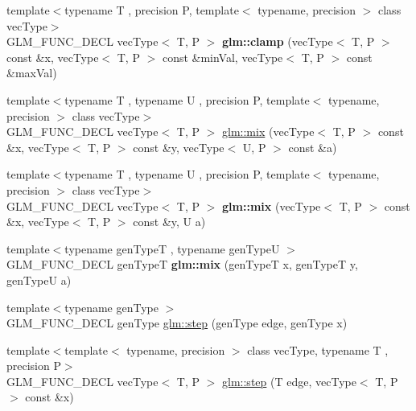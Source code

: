 \begin{DoxyCompactItemize}
\item 
\mbox{\label{group__core__func__common_ga240b9ec68274f12a2c4b6debf8979d1c}} 
{\footnotesize template$<$typename T , precision P, template$<$ typename, precision $>$ class vec\+Type$>$ }\\G\+L\+M\+\_\+\+F\+U\+N\+C\+\_\+\+D\+E\+CL vec\+Type$<$ T, P $>$ {\bfseries glm\+::clamp} (vec\+Type$<$ T, P $>$ const \&x, vec\+Type$<$ T, P $>$ const \&min\+Val, vec\+Type$<$ T, P $>$ const \&max\+Val)
\item 
{\footnotesize template$<$typename T , typename U , precision P, template$<$ typename, precision $>$ class vec\+Type$>$ }\\G\+L\+M\+\_\+\+F\+U\+N\+C\+\_\+\+D\+E\+CL vec\+Type$<$ T, P $>$ \hyperlink{group__core__func__common_gadccbaffe46f369cf1a96b2aef92cbfdd}{glm\+::mix} (vec\+Type$<$ T, P $>$ const \&x, vec\+Type$<$ T, P $>$ const \&y, vec\+Type$<$ U, P $>$ const \&a)
\item 
\mbox{\label{group__core__func__common_gaa51ef964cbf80ee9c2364d629693c8c8}} 
{\footnotesize template$<$typename T , typename U , precision P, template$<$ typename, precision $>$ class vec\+Type$>$ }\\G\+L\+M\+\_\+\+F\+U\+N\+C\+\_\+\+D\+E\+CL vec\+Type$<$ T, P $>$ {\bfseries glm\+::mix} (vec\+Type$<$ T, P $>$ const \&x, vec\+Type$<$ T, P $>$ const \&y, U a)
\item 
\mbox{\label{group__core__func__common_ga8e93f374aae27d1a88b921860351f8d4}} 
{\footnotesize template$<$typename gen\+TypeT , typename gen\+TypeU $>$ }\\G\+L\+M\+\_\+\+F\+U\+N\+C\+\_\+\+D\+E\+CL gen\+TypeT {\bfseries glm\+::mix} (gen\+TypeT x, gen\+TypeT y, gen\+TypeU a)
\item 
{\footnotesize template$<$typename gen\+Type $>$ }\\G\+L\+M\+\_\+\+F\+U\+N\+C\+\_\+\+D\+E\+CL gen\+Type \hyperlink{group__core__func__common_ga015a1261ff23e12650211aa872863cce}{glm\+::step} (gen\+Type edge, gen\+Type x)
\item 
{\footnotesize template$<$template$<$ typename, precision $>$ class vec\+Type, typename T , precision P$>$ }\\G\+L\+M\+\_\+\+F\+U\+N\+C\+\_\+\+D\+E\+CL vec\+Type$<$ T, P $>$ \hyperlink{group__core__func__common_gaf15b74ab672af2c7d7b535a9b4803700}{glm\+::step} (T edge, vec\+Type$<$ T, P $>$ const \&x)

\end{DoxyCompactItemize}
